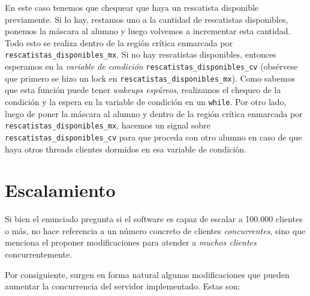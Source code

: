 En este caso tenemos que chequear que haya un rescatista disponible previamente. Si lo hay, restamos uno a la cantidad de rescatistas disponibles, ponemos la máscara al alumno y luego volvemos a incrementar esta cantidad. Todo esto se realiza dentro de la región crítica enmarcada por \texttt{rescatistas\_disponibles\_mx}. Si no hay rescatistas disponibles, entonces esperamos en la \textit{variable de condición} \texttt{rescatistas\_disponibles\_cv} (obsérvese que primero se hizo un lock en \texttt{rescatistas\_disponibles\_mx}). Como sabemos que esta función puede tener \textit{wakeups espúreos}, realizamos el chequeo de la condición y la espera en la variable de condición en un \texttt{while}. Por otro lado, luego de poner la máscara al alumno y dentro de la región crítica enmarcada por \texttt{rescatistas\_disponibles\_mx}, hacemos un signal sobre \texttt{rescatistas\_disponibles\_cv} para que proceda con otro alumno en caso de que haya otros threads clientes dormidos en esa variable de condición.

\section{Escalamiento}

Si bien el enunciado pregunta si el software es capaz de escalar a 100.000 clientes o más, no hace referencia a un número concreto de clientes \textit{concurrentes}, sino que menciona el proponer modificaciones para atender a \textit{muchos clientes} concurrentemente.

Por consiguiente, surgen en forma natural algunas modificaciones que pueden aumentar la concurrencia del servidor implementado. Estas son:

